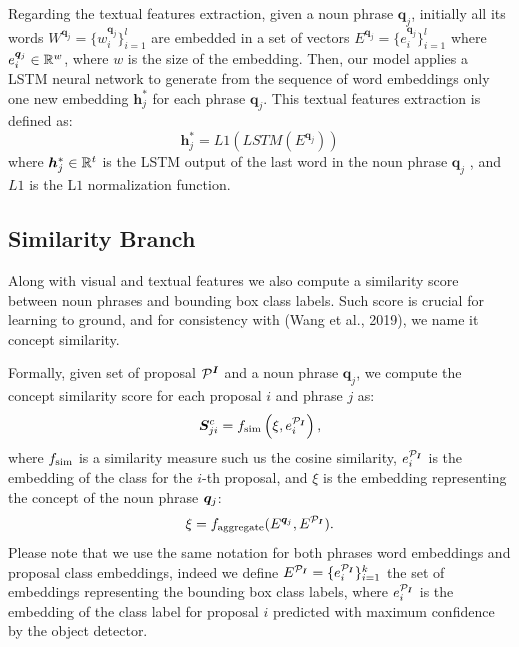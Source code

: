 \documentclass{article}
\begin{document}
Regarding the textual features extraction, given a noun phrase
$\bm{q}_j$, initially all its words $W^{\bm{q}_j} = \{ w^{\bm{q}_j}_i
\}^l_{i=1}$ are embedded in a set of vectors $E^{\bm{q}_j} =
\{e^{\bm{q}_j}_i \}^l_{i=1}$ where $e^{\bm{q}_j}_i \in \mathbb{R}^w$, where
$w$ is the size of the embedding. Then, our model applies a LSTM
neural network to generate from the sequence of word embeddings only
one new embedding $\bm{h}^*_j$ for each phrase $\bm{q}_j$. This
textual features extraction is defined as:
\begin{equation}
  \bm{h}^*_j = L1(LSTM(E^{\bm{q}_j}))
\end{equation}
where $\bm{h}^*_j \in \mathbb{R}^t$ is the LSTM output of the last word in
the noun phrase $\bm{q}_j$ , and $L1$ is the L$1$ normalization
function.

\subsection{Similarity Branch}

Along with visual and textual features we also compute a similarity
score between noun phrases and bounding box class labels. Such score
is crucial for learning to ground, and for consistency with (Wang et
al., 2019), we name it concept similarity. 



Formally, given set of proposal $\mathcal{P}^{\bm{I}}$ and a noun phrase
$\bm{q}_j$, we compute the concept similarity score for each proposal
$i$ and phrase $j$ as:
\begin{equation}
  \bm{S}^c_{ji} = f_{\text{sim}} \left( \xi, e^{\mathcal{P}_{\bm{I}}}_i \right),
\end{equation}
where $f_{\text{sim}}$ is a similarity measure such us the cosine similarity,
$e^{\mathcal{P}_{\bm{I}}}_i$ is the embedding of the class for the $i$-th proposal, and
$\xi$ is the embedding representing the concept of the noun phrase
$\bm{q}_j$:
\begin{equation}
  \xi = f_{\text{aggregate}}(E^{\bm{q}_j}, E^{\mathcal{P}_{\bm{I}}}).
\end{equation}
Please note that we use the same notation for both phrases word
embeddings and proposal class embeddings, indeed we define $E^{\mathcal{P}_{\bm{I}}} =
\{e^{\mathcal{P}_{\bm{I}}}_i \}^{k}_{i=1}$ the set of embeddings representing the bounding
box class labels, where $e^{\mathcal{P}_{\bm{I}}}_i$ is the embedding of the class label
for proposal $i$ predicted with maximum confidence by the object
detector. 
\end{document}
